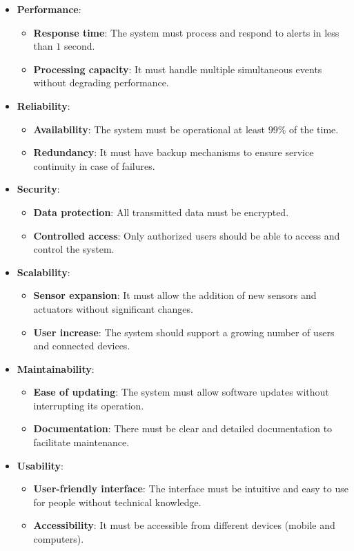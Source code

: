 \begin{itemize}
    \item \textbf{Performance}:
        \begin{itemize}
            \item \textbf{Response time}: The system must process and respond to alerts in less than $1$ second.
            \item \textbf{Processing capacity}: It must handle multiple simultaneous events without degrading performance.
        \end{itemize}
    \item \textbf{Reliability}:
        \begin{itemize}
            \item \textbf{Availability}: The system must be operational at least $99 \%$ of the time.
            \item \textbf{Redundancy}: It must have backup mechanisms to ensure service continuity in case of failures.
        \end{itemize}
    \item \textbf{Security}:
        \begin{itemize}
            \item \textbf{Data protection}: All transmitted data must be encrypted.
            \item \textbf{Controlled access}: Only authorized users should be able to access and control the system.
        \end{itemize}
    \item \textbf{Scalability}:
        \begin{itemize}
            \item \textbf{Sensor expansion}: It must allow the addition of new sensors and actuators without significant changes.
            \item \textbf{User increase}: The system should support a growing number of users and connected devices. 
        \end{itemize}
    \item \textbf{Maintainability}:
        \begin{itemize}
            \item \textbf{Ease of updating}: The system must allow software updates without interrupting its operation.
            \item \textbf{Documentation}: There must be clear and detailed documentation to facilitate maintenance.
        \end{itemize}
    \item \textbf{Usability}:
        \begin{itemize}
            \item \textbf{User-friendly interface}: The interface must be intuitive and easy to use for people without technical knowledge.
            \item \textbf{Accessibility}: It must be accessible from different devices (mobile and computers).
        \end{itemize}
\end{itemize}

